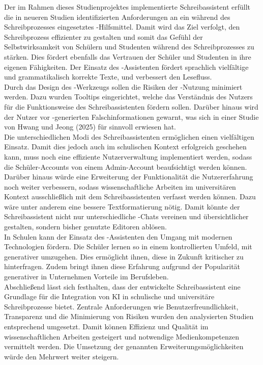 \documentclass[../main.tex]{subfiles}
\begin{document}
Der im Rahmen dieses Studienprojektes implementierte Schreibassistent erfüllt die in neueren Studien identifizierten Anforderungen an ein während des Schreibprozesses eingesetztes 
-Hilfsmittel. Damit wird das Ziel verfolgt, den Schreibprozess effizienter zu gestalten und somit das Gefühl der Selbstwirksamkeit von Schülern und Studenten während des 
Schreibprozesses zu stärken. Dies fördert ebenfalls das Vertrauen der Schüler und Studenten in ihre eigenen Fähigkeiten. Der Einsatz des -Assistenten fördert sprachlich vielfältige 
und grammatikalisch korrekte Texte, und verbessert den Lesefluss. \\
Durch das Design des -Werkzeugs sollen die Risiken der -Nutzung minimiert werden. Dazu wurden Tooltips eingerichtet, welche das Verständnis des Nutzers für die Funktionsweise des 
Schreibassistenten fördern sollen. Darüber hinaus wird der Nutzer vor -generierten Falschinformationen gewarnt, was sich in einer Studie von Hwang und Jeong (2025) für sinnvoll 
erwiesen hat. \\
Die unterschiedlichen Modi des Schreibassistenten ermöglichen einen vielfältigen Einsatz. Damit dies jedoch auch im schulischen Kontext erfolgreich geschehen kann, muss noch eine 
effiziente Nutzerverwaltung implementiert werden, sodass die Schüler-Accounts von einem Admin-Account beaufsichtigt werden können.\\
Darüber hinaus würde eine Erweiterung der Funktionalität die Nutzererfahrung noch weiter verbessern, sodass wissenschaftliche Arbeiten im universitären Kontext ausschließlich 
mit dem Schreibassistenten verfasst werden können. Dazu wäre unter anderem eine bessere Textformatierung nötig. Damit könnte der Schreibassistent nicht nur unterschiedliche -Chats vereinen und übersichtlicher gestalten, sondern bisher genutzte 
Editoren ablösen.\\
In Schulen kann der Einsatz des -Assistenten den Umgang mit modernen Technologien fördern. Die Schüler lernen so in einem kontrollierten Umfeld, mit generativer  umzugehen. 
Dies ermöglicht ihnen, diese in Zukunft kritischer zu hinterfragen. Zudem bringt ihnen diese Erfahrung aufgrund der Popularität generativer  in Unternehmen Vorteile im Berufsleben.\\
Abschließend lässt sich festhalten, dass der entwickelte Schreibassistent eine Grundlage für die Integration von KI in schulische und universitäre Schreibprozesse bietet. 
Zentrale Anforderungen wie Benutzerfreundlichkeit, Transparenz und die Minimierung von Risiken wurden den analysierten Studien entsprechend umgesetzt. 
Damit können Effizienz und Qualität im wissenschaftlichen Arbeiten gesteigert und notwendige Medienkompetenzen vermittelt werden. Die Umsetzung der genannten Erweiterungsmöglichkeiten würde 
den Mehrwert weiter steigern. 
\end{document}
